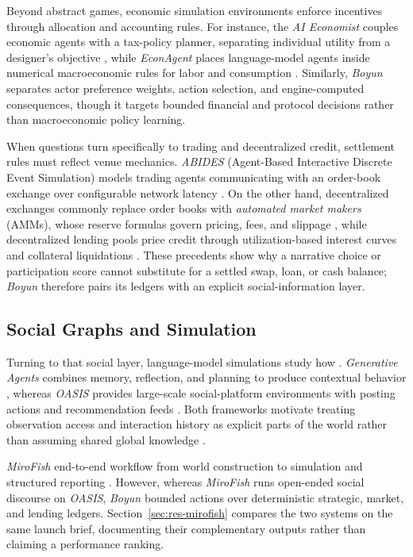 Beyond abstract games, economic simulation environments enforce
incentives through allocation and accounting rules. For instance, the
\textit{AI Economist} couples economic agents with a tax-policy planner,
separating individual utility from a designer's objective \cite{zheng2020},
while \textit{EconAgent} places language-model agents inside numerical
macroeconomic rules for labor and consumption \cite{li2024econagent}.
Similarly, \textit{Boyun} separates actor preference weights,
action selection, and engine-computed consequences, though it targets bounded
financial and protocol decisions rather than macroeconomic policy learning.

When questions turn specifically to trading and decentralized credit,
settlement rules must reflect venue mechanics. \textit{ABIDES} (Agent-Based
Interactive Discrete Event Simulation) models trading agents communicating with
an order-book exchange over configurable network latency \cite{byrd2019}.
On the other hand, decentralized exchanges commonly replace order books
with \textit{automated market makers} (AMMs), whose reserve formulas govern
pricing, fees, and slippage \cite{angeris2021,xu2023amm}, while decentralized
lending pools price credit through utilization-based interest curves and
collateral liquidations \cite{gudgeon2020}. These precedents show why a
narrative choice or participation score cannot substitute for a settled swap,
loan, or cash balance; \textit{Boyun} therefore pairs its ledgers with an
explicit social-information layer.

\subsection{Social Graphs and  Simulation}
Turning to that social layer, language-model simulations study how
. \textit{Generative Agents} combines memory,
reflection, and planning to produce contextual behavior \cite{park2023},
whereas \textit{OASIS} provides large-scale social-platform environments with
posting actions and recommendation feeds \cite{yang2025}. Both frameworks
motivate treating observation access and interaction history as explicit parts
of the world rather than assuming shared global knowledge .

 \textit{MiroFish} 
end-to-end workflow from world construction to  simulation and
structured reporting \cite{mirofish}. However, whereas \textit{MiroFish} runs
open-ended social discourse on \textit{OASIS}, \textit{Boyun}  bounded
actions over deterministic strategic, market, and lending ledgers.
Section~\ref{sec:res-mirofish} compares the two systems on the same launch
brief, documenting their complementary outputs rather than claiming a
performance ranking.


